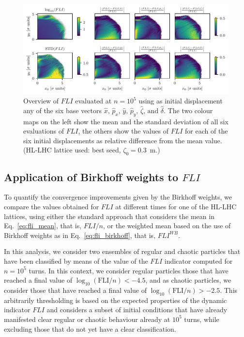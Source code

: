 \begin{figure}[htp]
    \centering
    \includegraphics[width=1.0\textwidth]{6_lhc_dynamic_indicators/figs/LE_FLI_high_main_idx_8.pdf}
    \caption{Overview of $FLI$ evaluated at $n=10^5$ using as initial displacement any of the six base vectors $\hat{x},\,\hat{p}_x,\,\hat{y},\,\hat{p}_y,\,\hat{\zeta},\,\text{and }\hat{\delta}$. The two colour maps on the left show the mean and the standard deviation of all six evaluations of $FLI$, the others show the values of $FLI$ for each of the six initial displacements as relative difference from the mean value. (HL-LHC lattice used: best seed, $\zeta_0=$\SI{0.3}{\meter}.)}
    \label{fig:fli_compare}
\end{figure}

\subsection{Application of Birkhoff weights to $FLI$}

To quantify the convergence improvements given by the Birkhoff weights, we compare the values obtained for $FLI$ at different times for one of the HL-LHC lattices, using either the standard approach that considers the mean in Eq.~\eqref{eq:fli_mean}, that is, $FLI/n$, or the weighted mean based on the use of Birkhoff weights as in Eq.~\eqref{eq:fli_birkhoff}, that is, $FLI^{WB}$.

In this analysis, we consider two ensembles of regular and chaotic particles that have been classified by means of the value of the $FLI$ indicator computed for $n=10^5$ turns. In this context, we consider regular particles those that have reached a final value of $\log_{10}(\mathrm{FLI}/n) < -4.5$, and as chaotic particles, we consider those that have reached a final value of $\log_{10}(\mathrm{FLI}/n) > -2.5$. This arbitrarily thresholding is based on the expected properties of the dynamic indicator $FLI$ and considers a subset of initial conditions that have already manifested clear regular or chaotic behaviour already at $10^5$ turns, while excluding those that do not yet have a clear classification.


